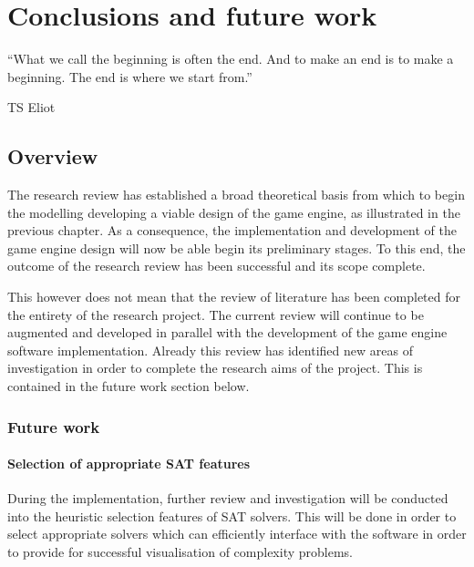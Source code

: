 \documentclass[11pt, a4paper, oneside]{report} %
\begin{document}

\chapter{Conclusions and future work}

\epigraph{``What we call the beginning is often the end. And to make an end is
to make a beginning. The end is where we start from.''}{TS Eliot}

\section{Overview}

The research review has established a broad theoretical basis from which to
begin the modelling developing a viable design of the game engine, as
illustrated in the previous chapter. As a consequence, the implementation and
development of the game engine design will now be able begin its preliminary
stages. To this end, the outcome of the research review has been successful and
its scope complete.

This however does not mean that the review of literature has been completed for
the entirety of the research project. The current review will continue to be
augmented and developed in parallel with the development of the game engine
software implementation. Already this review has identified new areas of
investigation in order to complete the research aims of the project. This is
contained in the future work section below.

\subsection{Future work}

\subsubsection{Selection of appropriate SAT features}

During the implementation, further review and investigation will be conducted
into the heuristic selection features of SAT solvers. This will be done in order
to select appropriate solvers which can efficiently interface with the software
in order to provide for successful visualisation of complexity problems.
\end{document}
